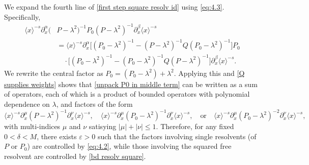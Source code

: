 \documentclass[11pt]{amsart}
\numberwithin{equation}{section}
\begin{document}
We expand the fourth line of \eqref{first step square resolv id} using \eqref{eq:4.3}. Specifically,
\begin{equation} \label{unpack P0 in middle term}
\begin{split}
\langle x \rangle^{-s} \partial^\alpha_x(&P-\lambda^2)^{-1}P_0(P-\lambda^2)^{-1} \partial^\beta_x\langle x \rangle^{-s} \\
&= \langle x \rangle^{-s}  \partial^\alpha_x \big[ (P_0 - \lambda^2)^{-1} - (P- \lambda^2)^{-1} Q (P_0 - \lambda^2)^{-1} \big] P_0 \\
&\quad \cdot \big[ (P_0 - \lambda^2)^{-1} - (P_0- \lambda^2)^{-1} Q (P - \lambda^2)^{-1} \big]  \partial^\beta_x \langle x \rangle^{-s}.
\end{split}
\end{equation}
We rewrite the central factor as $P_0 = (P_0 - \lambda^2) + \lambda^2$. Applying this and \eqref{Q supplies weights} shows that \eqref{unpack P0 in middle term} can be written as a sum of operators, each of which is a product of bounded operators with polynomial dependence on $
\lambda$, and factors  of the form
\begin{equation*}
\langle x \rangle^{-s} \partial^\mu_x(P - \lambda^2)^{-1}\partial^\nu_x \langle x \rangle^{-s}, \quad
\langle x \rangle^{-s} \partial^\mu_x(P_0 - \lambda^2)^{-1}\partial^\nu_x \langle x \rangle^{-s}, \quad \text{or} \quad
\langle x \rangle^{-s} \partial^\mu_x(P_0 - \lambda^2)^{-2}\partial^\nu_x \langle x \rangle^{-s},
\end{equation*}
with multi-indices $\mu$ and $\nu$ satisying $|\mu| + |\nu| \le 1$. Therefore, for any fixed $0 < \delta < M$, there exists $\varepsilon > 0$ such that the factors involving single resolvents (of $P$ or $P_0$) are controlled by \eqref{eq:4.2}, while those involving the squared free resolvent are controlled by \eqref{bd resolv square}.
\end{document}
